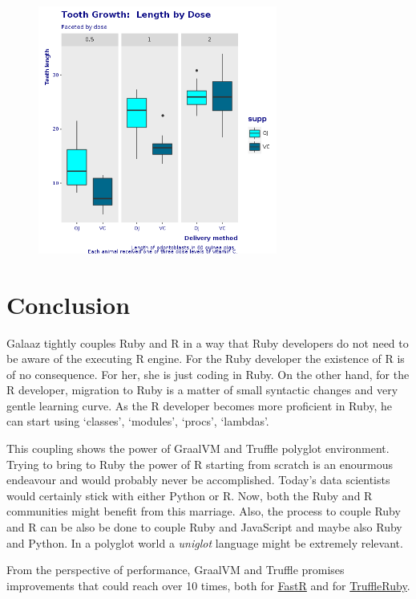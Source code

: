 \documentclass[11pt,]{article}
\begin{document}
\begin{figure}
\centering
\includegraphics[width=0.70000\textwidth]{figures/facet_by_dose.png}
\caption{}
\end{figure}

\section{Conclusion}\label{conclusion}

Galaaz tightly couples Ruby and R in a way that Ruby developers do not
need to be aware of the executing R engine. For the Ruby developer the
existence of R is of no consequence. For her, she is just coding in
Ruby. On the other hand, for the R developer, migration to Ruby is a
matter of small syntactic changes and very gentle learning curve. As the
R developer becomes more proficient in Ruby, he can start using
`classes', `modules', `procs', `lambdas'.

This coupling shows the power of GraalVM and Truffle polyglot
environment. Trying to bring to Ruby the power of R starting from
scratch is an enourmous endeavour and would probably never be
accomplished. Today's data scientists would certainly stick with either
Python or R. Now, both the Ruby and R communities might benefit from
this marriage. Also, the process to couple Ruby and R can be also be
done to couple Ruby and JavaScript and maybe also Ruby and Python. In a
polyglot world a \emph{uniglot} language might be extremely relevant.

From the perspective of performance, GraalVM and Truffle promises
improvements that could reach over 10 times, both for
\href{https://medium.com/graalvm/faster-r-with-fastr-4b8db0e0dceb}{FastR}
and for
\href{https://rubykaigi.org/2018/presentations/eregontp.html}{TruffleRuby}.
\end{document}
